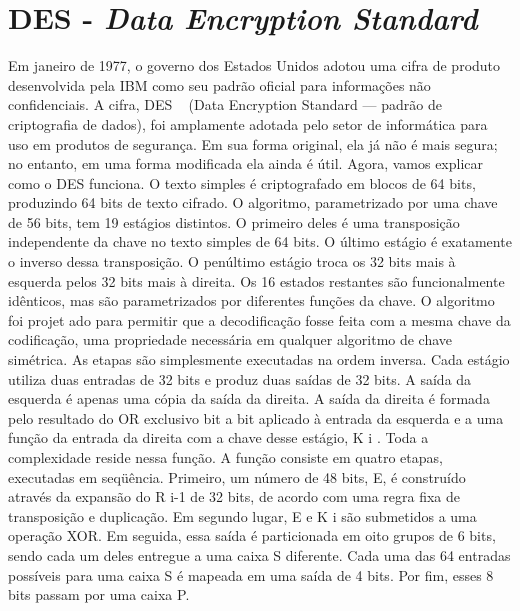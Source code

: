 \section {DES - \emph{Data Encryption Standard}}


Em janeiro de 1977, o governo dos Estados Unidos adotou uma cifra de produto desenvolvida pela
IBM como seu padrão oficial para informações não confidenciais. A cifra, DES ~\cite{greg} (Data Encryption Standard — padrão de criptografia de dados), foi amplamente adotada pelo setor de informática para uso em produtos de segurança. Em sua forma original, ela já não é mais segura;
no entanto, em uma forma modificada ela ainda é útil. Agora, vamos explicar como o DES funciona. O texto simples é criptografado em blocos de 64
bits, produzindo 64 bits de texto cifrado. O algoritmo, parametrizado por uma chave de 56 bits, tem
19 estágios distintos. O primeiro deles é uma transposição independente da chave no texto simples
de 64 bits. O último estágio é exatamente o inverso dessa transposição. O penúltimo estágio troca
os 32 bits mais à esquerda pelos 32 bits mais à direita. Os 16 estados restantes são funcionalmente
idênticos, mas são parametrizados por diferentes funções da chave. O algoritmo foi projet ado para
permitir que a decodificação fosse feita com a mesma chave da codificação, uma propriedade
necessária em qualquer algoritmo de chave simétrica. As etapas são simplesmente executadas na
ordem inversa.
Cada estágio utiliza duas
entradas de 32 bits e produz duas saídas de 32 bits. A saída da esquerda é apenas uma cópia da
saída da direita. A saída da direita é formada pelo resultado do OR exclusivo bit a bit aplicado à
entrada da esquerda e a uma função da entrada da direita com a chave desse estágio, K i . Toda a
complexidade reside nessa função.
A função consiste em quatro etapas, executadas em seqüência. Primeiro, um número de 48 bits, E,
é construído através da expansão do R i-1 de 32 bits, de acordo com uma regra fixa de transposição
e duplicação. Em segundo lugar, E e K i são submetidos a uma operação XOR. Em seguida, essa
saída é particionada em oito grupos de 6 bits, sendo cada um deles entregue a uma caixa S
diferente. Cada uma das 64 entradas possíveis para uma caixa S é mapeada em uma saída de 4 bits. Por fim, esses 8 bits passam por uma caixa P.

















